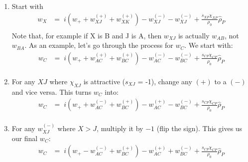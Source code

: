 \documentclass{article}
\begin{document}
\begin{enumerate}
  \item Start with
  {
    \begin{align*}
      w_X &=\;
        i \left( w_+ + w_{XJ}^{(+)} + w_{XK}^{(+)} \right)
        - w_{XJ}^{(-)} - w_{XJ}^{(-)}
        + \frac{s_{XP}\chi_{XP}}{\rho_0} \hat{\rho}_P \\
    \end{align*}
  }
  Note that, for example if X is B and J is A, then $w_{XJ}$ is actually $w_{AB}$,
    not $w_{BA}$.
  As an example, let's go through the process for $w_C$.
  We start with:
  {
    \begin{align*}
      w_C &=\;
        i \left( w_+ + w_{AC}^{(+)} + w_{BC}^{(+)} \right)
        - w_{AC}^{(-)} - w_{BC}^{(-)}
    + \frac{s_{CP}\chi_{CP}}{\rho_0} \hat{\rho}_P \\
    \end{align*}
  }
  \item For any $XJ$ where $\chi_{XJ}$ is attractive ($s_{XJ}$ = -1), change any
    $(+)$ to a $(-)$ and vice versa.
  This turns $w_C$ into:
  {
    \begin{align*}
      w_C &=\;
        i \left( w_+ + w_{AC}^{(-)} + w_{BC}^{(+)} \right)
        - w_{AC}^{(+)} - w_{BC}^{(-)}
    + \frac{s_{CP}\chi_{CP}}{\rho_0} \hat{\rho}_P \\
    \end{align*}
  }
  \item For any $w_{XJ}^{(-)}$ where $X > J$, multiply it by $-1$ (flip the sign).
  This gives us our final $w_C$:  
  {     
    \begin{align*}
      w_C &=\;
        i \left( w_+ - w_{AC}^{(-)} + w_{BC}^{(+)} \right)
        - w_{AC}^{(+)} + w_{BC}^{(-)}
    + \frac{s_{CP}\chi_{CP}}{\rho_0} \hat{\rho}_P \\
    \end{align*}
  }
\end{enumerate}

\end{document}
